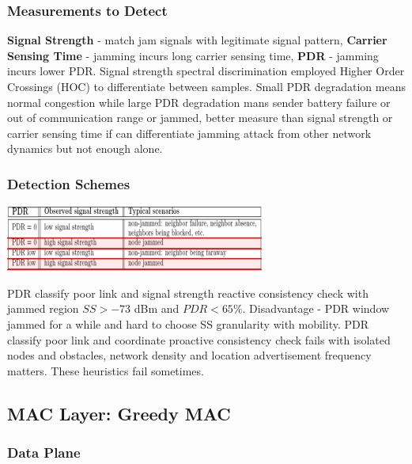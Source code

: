 \documentclass[9pt]{extarticle}
\begin{document}
\begin{multicols}{2}
\subsubsection{Measurements to Detect}

\textbf{Signal Strength }- match jam signals with legitimate signal pattern, \textbf{Carrier Sensing Time }- jamming incurs long carrier sensing time, \textbf{PDR} - jamming incurs lower PDR. Signal strength spectral discrimination employed Higher Order Crossings (HOC) to differentiate between samples. Small PDR degradation means normal congestion while large PDR degradation mans sender battery failure or out of communication range or jammed, better measure than signal strength or carrier sensing time if can differentiate jamming attack from other network dynamics but not enough alone.

\subsubsection{Detection Schemes}

\includegraphics{pdrss.png}

PDR classify poor link and signal strength reactive consistency check with jammed region $SS>-73$ dBm and $PDR<65\%$. Disadvantage - PDR window jammed for a while and hard to choose SS granularity with mobility. PDR classify poor link and coordinate proactive consistency check fails with isolated nodes and obstacles, network density and location advertisement frequency matters. These heuristics fail sometimes.

\subsection{MAC Layer: Greedy MAC}

\subsubsection{Data Plane}


\end{multicols}
\end{document}
